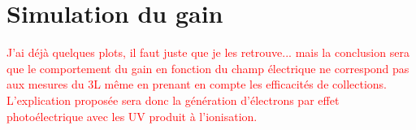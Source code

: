   \section{Simulation du gain}\label{sec::gain_simulation}
    \textcolor{red}{J'ai déjà quelques plots, il faut juste que je les retrouve... mais la conclusion sera que le comportement du gain en fonction du champ électrique ne correspond pas aux mesures du 3L même en prenant en compte les efficacités de collections. L'explication proposée sera donc la génération d'électrons par effet photoélectrique avec les UV produit à l'ionisation.}
        
\FloatBarrier

\printbibliography